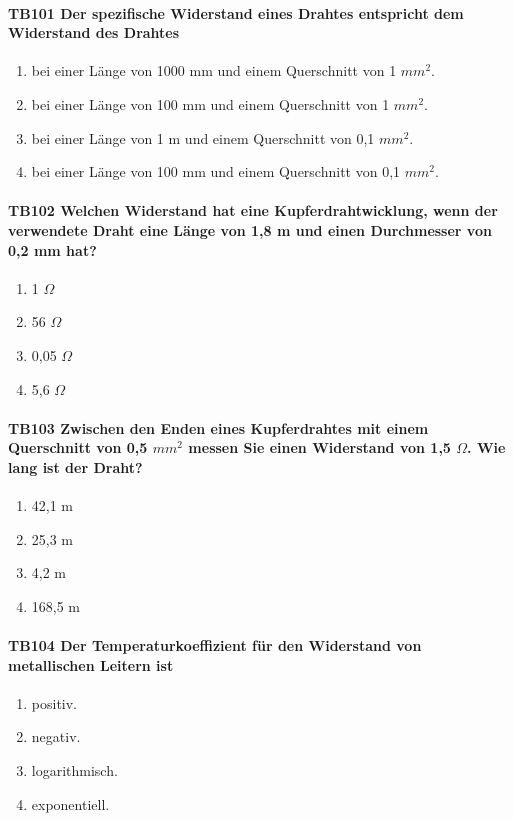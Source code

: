 \documentclass[8pt]{article}
\begin{document}
\begin{enumerate}
\paragraph*{TB101 Der spezifische Widerstand eines Drahtes entspricht dem Widerstand des Drahtes}
\begin{enumerate}[nolistsep,label=\Alph*]
\item bei einer Länge von 1000 mm und einem Querschnitt von 1 $mm^{2}$. 
\item bei einer Länge von 100 mm und einem Querschnitt von 1 $mm^{2}$.
\item bei einer Länge von 1 m und einem Querschnitt von 0,1 $mm^{2}$.
\item bei einer Länge von 100 mm und einem Querschnitt von 0,1 $mm^{2}$.
\end{enumerate}



\paragraph*{TB102 Welchen Widerstand hat eine Kupferdrahtwicklung, wenn der verwendete Draht eine Länge von 1,8 m und einen Durchmesser von 0,2 mm hat?}
\begin{enumerate}[nolistsep,label=\Alph*]
\item 1 $\Omega$
\item 56 $\Omega$
\item 0,05 $\Omega$
\item 5,6 $\Omega$
\end{enumerate}



\paragraph*{TB103 Zwischen den Enden eines Kupferdrahtes mit einem Querschnitt von 0,5 $mm^{2}$ messen Sie einen Widerstand von 1,5 $\Omega$. Wie lang ist der Draht?}
\begin{enumerate}[nolistsep,label=\Alph*]
\item 42,1 m
\item 25,3 m
\item 4,2 m
\item 168,5 m
\end{enumerate}



\paragraph*{TB104 Der Temperaturkoeffizient für den Widerstand von metallischen Leitern ist}
\begin{enumerate}[nolistsep,label=\Alph*]
\item positiv.
\item negativ.
\item logarithmisch.
\item exponentiell.
\end{enumerate}




\end{enumerate}
\end{document}
